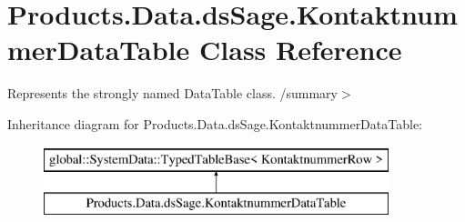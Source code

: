 \hypertarget{class_products_1_1_data_1_1ds_sage_1_1_kontaktnummer_data_table}{}\section{Products.\+Data.\+ds\+Sage.\+Kontaktnummer\+Data\+Table Class Reference}
\label{class_products_1_1_data_1_1ds_sage_1_1_kontaktnummer_data_table}


Represents the strongly named Data\+Table class. /summary$>$  


Inheritance diagram for Products.\+Data.\+ds\+Sage.\+Kontaktnummer\+Data\+Table\+:\begin{figure}[H]
\begin{center}
\leavevmode
\includegraphics[height=2.000000cm]{class_products_1_1_data_1_1ds_sage_1_1_kontaktnummer_data_table}
\end{center}
\end{figure}
